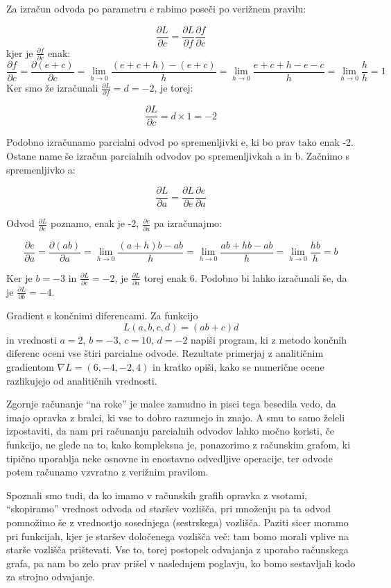Za izračun odvoda po parametru \( c \) rabimo poseči po verižnem pravilu:

\[
\frac{\partial L}{\partial c} = \frac{\partial L}{\partial f} \frac{\partial f}{\partial c}
\]
%
\noindent kjer je \( \frac{\partial f}{\partial c} \) enak:
%
\[
\frac{\partial f}{\partial c} = \frac{\partial (e+c)}{\partial c} = \lim_{h \to 0} \frac{(e+c+h) - (e+c)}{h} = \lim_{h \to 0} \frac{e+c+h-e-c}{h} = \lim_{h \to 0} \frac{h}{h} = 1
\]
%
\noindent Ker smo že izračunali \( \frac{\partial L}{\partial f} = d = -2 \), je torej:

\[
\frac{\partial L}{\partial c} = d \times 1 = -2
\]

Podobno izračunamo parcialni odvod po spremenljivki e, ki bo prav tako enak -2. Ostane name še izračun parcialnih odvodov po spremenljivkah a in b. Začnimo s spremenljivko a:

\[
\frac{\partial L}{\partial a} = \frac{\partial L}{\partial e} \frac{\partial e}{\partial a}
\]

Odvod \( \frac{\partial L}{\partial e} \) poznamo, enak je -2, \( \frac{\partial e}{\partial a} \) pa izračunajmo:

\[
\frac{\partial e}{\partial a} = \frac{\partial (ab)}{\partial a} = \lim_{h \to 0} \frac{(a+h)b - ab}{h} = \lim_{h \to 0} \frac{ab + hb - ab}{h} = \lim_{h \to 0} \frac{hb}{h} = b
\]

Ker je \( b = -3 \) in \( \frac{\partial L}{\partial e} = -2 \), je \( \frac{\partial L}{\partial a} \) torej enak 6. Podobno bi lahko izračunali še, da je \( \frac{\partial L}{\partial b} = -4 \). 

\begin{exercise}{Gradient s končnimi diferencami.}
Za funkcijo
\[
L(a, b, c, d) = (ab + c) d
\]
in vrednosti $a=2$, $b=-3$, $c=10$, $d=-2$ napiši program, ki z metodo končnih diferenc oceni vse štiri parcialne odvode. Rezultate primerjaj z analitičnim gradientom $\nabla L = (6, -4, -2, 4)$ in kratko opiši, kako se numerične ocene razlikujejo od analitičnih vrednosti.
\end{exercise}

Zgornje računanje ``na roke'' je malce zamudno in pisci tega besedila vedo, da imajo opravka z bralci, ki vse to dobro razumejo in znajo. A smu to samo želeli izpostaviti, da nam pri računanju parcialnih odvodov lahko močno koristi, če funkcijo, ne glede na to, kako kompleksna je, ponazorimo z računskim grafom, ki tipično uporablja neke osnovne in enostavno odvedljive operacije, ter odvode potem računamo vzvratno z verižnim pravilom. 

Spoznali smo tudi, da ko imamo v računskih grafih opravka z vsotami,  ``skopiramo'' vrednost odvoda od staršev vozlišča, pri množenju pa ta odvod pomnožimo še z vrednostjo sosednjega (sestrskega) vozlišča. Paziti sicer moramo pri funkcijah, kjer je staršev določenega vozlišča več: tam bomo morali vplive na starše vozlišča prištevati. Vse to, torej postopek odvajanja z uporabo računskega grafa, pa nam bo zelo prav prišel v naslednjem poglavju, ko bomo sestavljali kodo za strojno odvajanje.

